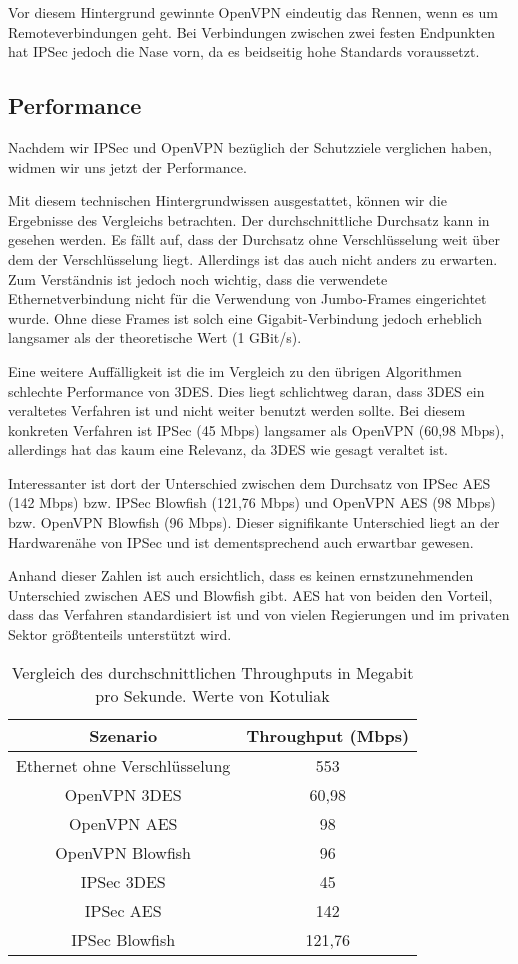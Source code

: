 \documentclass[12pt]{scrartcl}
\begin{document}
Vor diesem Hintergrund gewinnte OpenVPN eindeutig das Rennen, wenn es um Remoteverbindungen geht. Bei Verbindungen zwischen zwei festen Endpunkten hat IPSec jedoch die Nase vorn, da es beidseitig hohe Standards voraussetzt.

\subsection{Performance}
Nachdem wir IPSec und OpenVPN bezüglich der Schutzziele verglichen haben, widmen wir uns jetzt der Performance.

Mit diesem technischen Hintergrundwissen ausgestattet, können wir die Ergebnisse des Vergleichs betrachten. Der durchschnittliche Durchsatz kann in  gesehen werden. Es fällt auf, dass der Durchsatz ohne Verschlüsselung weit über dem der Verschlüsselung liegt. Allerdings ist das auch nicht anders zu erwarten. Zum Verständnis ist jedoch noch wichtig, dass die verwendete Ethernetverbindung nicht für die Verwendung von Jumbo-Frames eingerichtet wurde. Ohne diese Frames ist solch eine Gigabit-Verbindung jedoch erheblich langsamer als der theoretische Wert (1 GBit/s).\cite{Kotuliak2011}

Eine weitere Auffälligkeit ist die im Vergleich zu den übrigen Algorithmen schlechte Performance von 3DES. Dies liegt schlichtweg daran, dass 3DES ein veraltetes Verfahren ist und nicht weiter benutzt werden sollte. Bei diesem konkreten Verfahren ist IPSec (45 Mbps) langsamer als OpenVPN (60,98 Mbps), allerdings hat das kaum eine Relevanz, da 3DES wie gesagt veraltet ist.

Interessanter ist dort der Unterschied zwischen dem Durchsatz von IPSec AES (142 Mbps) bzw. IPSec Blowfish (121,76 Mbps) und OpenVPN AES (98 Mbps) bzw. OpenVPN Blowfish (96 Mbps). Dieser signifikante Unterschied liegt an der Hardwarenähe von IPSec und ist dementsprechend auch erwartbar gewesen.

Anhand dieser Zahlen ist auch ersichtlich, dass es keinen ernstzunehmenden Unterschied zwischen AES und Blowfish gibt. AES hat von beiden den Vorteil, dass das Verfahren standardisiert ist und von vielen Regierungen und im privaten Sektor größtenteils unterstützt wird.

\begin{table}
\caption{Vergleich des durchschnittlichen Throughputs in Megabit pro Sekunde. Werte von Kotuliak\cite{Kotuliak2011}}
\label{tab:tp}
\begin{tabular}{c|c}
Szenario & Throughput (Mbps) \\
\hline
Ethernet ohne Verschlüsselung & 553 \\
OpenVPN 3DES & 60,98 \\
OpenVPN AES & 98 \\
OpenVPN Blowfish & 96 \\
IPSec 3DES & 45 \\
IPSec AES & 142 \\
IPSec Blowfish & 121,76
\end{tabular}
\end{table}
\end{document}
